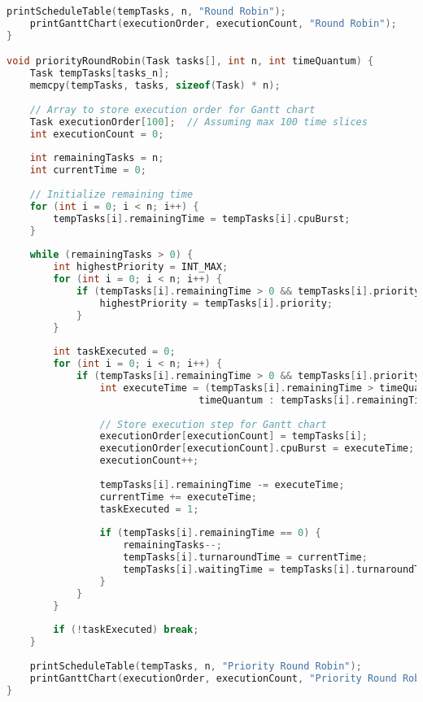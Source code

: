 \documentclass{article}
\begin{document}
\begin{lstlisting}[language=C, caption=Scheduling Code ]
    printScheduleTable(tempTasks, n, "Round Robin");
    printGanttChart(executionOrder, executionCount, "Round Robin");
}

void priorityRoundRobin(Task tasks[], int n, int timeQuantum) {
    Task tempTasks[tasks_n];
    memcpy(tempTasks, tasks, sizeof(Task) * n);
    
    // Array to store execution order for Gantt chart
    Task executionOrder[100];  // Assuming max 100 time slices
    int executionCount = 0;
    
    int remainingTasks = n;
    int currentTime = 0;
    
    // Initialize remaining time
    for (int i = 0; i < n; i++) {
        tempTasks[i].remainingTime = tempTasks[i].cpuBurst;
    }
    
    while (remainingTasks > 0) {
        int highestPriority = INT_MAX;
        for (int i = 0; i < n; i++) {
            if (tempTasks[i].remainingTime > 0 && tempTasks[i].priority < highestPriority) {
                highestPriority = tempTasks[i].priority;
            }
        }
        
        int taskExecuted = 0;
        for (int i = 0; i < n; i++) {
            if (tempTasks[i].remainingTime > 0 && tempTasks[i].priority == highestPriority) {
                int executeTime = (tempTasks[i].remainingTime > timeQuantum) ? 
                                 timeQuantum : tempTasks[i].remainingTime;
                
                // Store execution step for Gantt chart
                executionOrder[executionCount] = tempTasks[i];
                executionOrder[executionCount].cpuBurst = executeTime;
                executionCount++;
                
                tempTasks[i].remainingTime -= executeTime;
                currentTime += executeTime;
                taskExecuted = 1;
                
                if (tempTasks[i].remainingTime == 0) {
                    remainingTasks--;
                    tempTasks[i].turnaroundTime = currentTime;
                    tempTasks[i].waitingTime = tempTasks[i].turnaroundTime - tempTasks[i].cpuBurst;
                }
            }
        }
        
        if (!taskExecuted) break;
    }
    
    printScheduleTable(tempTasks, n, "Priority Round Robin");
    printGanttChart(executionOrder, executionCount, "Priority Round Robin");
}


\end{lstlisting}
\end{document}
